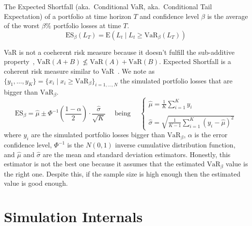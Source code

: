 \documentclass[11pt,fleqn]{book} %
\begin{document}
\begin{definition}
	The Expected Shortfall (aka.\ Conditional VaR, aka.\ Conditional Tail 
	Expectation) of a portfolio at time horizon $T$ and 
	confidence level $\beta$ is the average of the worst $\beta\%$ portfolio 
	losses at time $T$.
	\begin{displaymath}
		\text{ES}_\beta(L_T) = \text{E}(L_t \mid L_t \ge \text{VaR}_\beta(L_T))
	\end{displaymath}
\end{definition}

VaR is not a coeherent risk measure because it doesn't fulfill the sub-additive 
property~\cite{var:varbad}, $\text{VaR}(A+B) \nleq \text{VaR}(A)+\text{VaR}(B)$. 
Expected Shortfall is a coherent risk measure similar to VaR~\cite{var:eshortfall}.
We note as 
$\{y_1, \ldots, y_K\} = \{x_i \mid x_i \ge \text{VaR}_{\beta} \}_{i=1,\dots,N}$ 
the simulated portfolio losses that are bigger than $\text{VaR}_{\beta}$.
\begin{displaymath}
	\text{ES}_{\beta} = \widehat{\mu} \pm \Phi^{-1}\left(\frac{1-\alpha}{2}\right) \cdot \frac{\widehat{\sigma}}{\sqrt{K}}
	\quad \text{ being } \quad
	\left\{
	\begin{array}{l}
		\displaystyle
		\widehat{\mu} = \frac{1}{K} \sum_{i=1}^{K} y_i \\
		\\
		\displaystyle
		\widehat{\sigma} =
		\sqrt{\frac{1}{K-1} \sum_{i=1}^{K} \left( y_i - \widehat{\mu} \right)^2}
	\end{array}
	\right.
\end{displaymath}
where $y_i$ are the simulated portfolio losses bigger than $\text{VaR}_{\beta}$, 
$\alpha$ is the error confidence level, $\Phi^{-1}$ is the $N(0,1)$ 
inverse cumulative distribution function, and $\widehat{\mu}$ and 
$\widehat{\sigma}$ are the mean and standard deviation estimators.
Honestly, this estimator is not the best one because it assumes that
the estimated $\text{VaR}_{\beta}$ value is the right one. Despite this, 
if the sample size is high enough then the estimated value is good enough.

\section{Simulation Internals}
\end{document}
